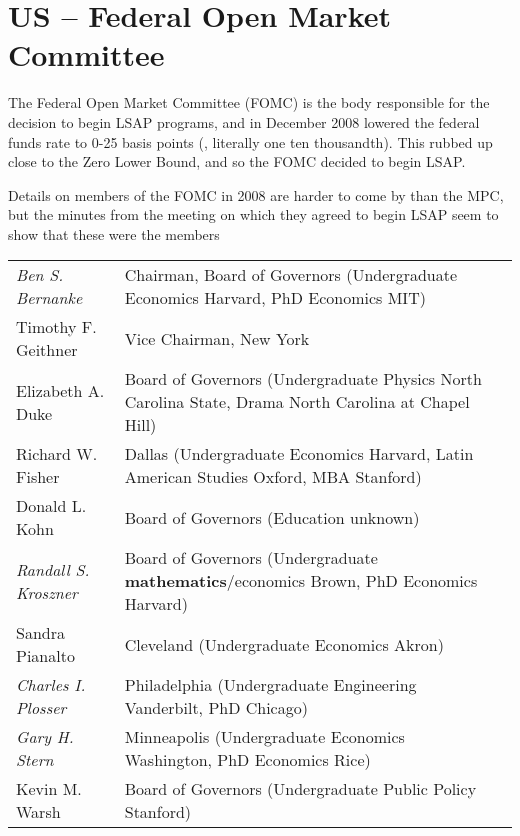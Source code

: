 \documentclass[notitlepage,12pt]{report}
\begin{document}
\section{US -- Federal Open Market Committee}

The Federal Open Market Committee (FOMC) is the body responsible for the decision to begin LSAP programs\cite[p.1]{gagnon_large-scale_2011}, and in December 2008 lowered the federal funds rate to 0-25 basis points (\textpertenthousand, literally one ten thousandth). This rubbed up close to the Zero Lower Bound, and so the FOMC decided to begin LSAP.

Details on members of the FOMC in 2008 are harder to come by than the MPC, but the minutes from the meeting on which they agreed to begin LSAP\cite{FOMC_minutes_2008} seem to show that these were the members\\

\begin{tabular}{@{$\bullet$ }lp{}l}
	{\it Ben S. Bernanke} & Chairman, Board of Governors (Undergraduate Economics Harvard, PhD Economics MIT)\\
	Timothy F. Geithner & Vice Chairman, New York\\
	Elizabeth A. Duke & Board of Governors (Undergraduate Physics North Carolina State, Drama North Carolina at Chapel Hill)\footnotemark\\
	Richard W. Fisher & Dallas (Undergraduate Economics Harvard, Latin American Studies Oxford, MBA Stanford)\\
	Donald L. Kohn & Board of Governors (Education unknown)\footnotemark\\
	{\it Randall S. Kroszner} & Board of Governors (Undergraduate {\bf mathematics}/economics Brown, PhD Economics Harvard)\\
	Sandra Pianalto & Cleveland (Undergraduate Economics Akron)\\
	{\it Charles I. Plosser} & Philadelphia (Undergraduate Engineering Vanderbilt, PhD Chicago)\\
	{\it Gary H. Stern} & Minneapolis (Undergraduate Economics Washington, PhD Economics Rice)\\
	Kevin M. Warsh & Board of Governors (Undergraduate Public Policy Stanford)\\
\end{tabular}

\addtocounter{footnote}{-1}
\end{document}
